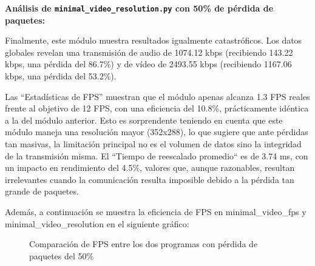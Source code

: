 \vspace{\baselineskip}

\textbf{Análisis de \texttt{minimal\_video\_resolution.py} con 50\% de pérdida de paquetes:}
\vspace{\baselineskip}

Finalmente, este módulo muestra resultados igualmente catastróficos. Los datos globales revelan una transmisión de audio de 1074.12 kbps (recibiendo 143.22 kbps, una pérdida del 86.7\%) y de vídeo de 2493.55 kbps (recibiendo 1167.06 kbps, una pérdida del 53.2\%).
\vspace{\baselineskip}

Las ``Estadísticas de FPS'' muestran que el módulo apenas alcanza 1.3 FPS reales frente al objetivo de 12 FPS, con una eficiencia del 10.8\%, prácticamente idéntica a la del módulo anterior. Esto es sorprendente teniendo en cuenta que este módulo maneja una resolución mayor (352x288), lo que sugiere que ante pérdidas tan masivas, la limitación principal no es el volumen de datos sino la integridad de la transmisión misma. El ``Tiempo de reescalado promedio`` es de 3.74 ms, con un impacto en rendimiento del 4.5\%, valores que, aunque razonables, resultan irrelevantes cuando la comunicación resulta imposible debido a la pérdida tan grande de paquetes.

\vspace{\baselineskip}

Además, a continuación se muestra la eficiencia de FPS en minimal\_video\_fps y minimal\_video\_resolution en el siguiente gráfico:
\begin{figure}[H]
\centering
{}
\caption{Comparación de FPS entre los dos programas con pérdida de paquetes del 50\%}
\label{fig:comparacionfps_50pct}
\end{figure}

